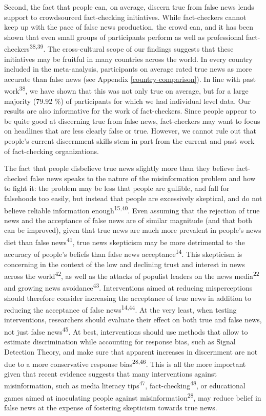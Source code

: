 \documentclass[
  doc,floatsintext]{apa6}
\begin{document}
Second, the fact that people can, on average, discern true from false news lends support to crowdsourced fact-checking initiatives. While fact-checkers cannot keep up with the pace of false news production, the crowd can, and it has been shown that even small groups of participants perform as well as professional fact-checkers\textsuperscript{38,39}. The cross-cultural scope of our findings suggests that these initiatives may be fruitful in many countries across the world. In every country included in the meta-analysis, participants on average rated true news as more accurate than false news (see Appendix \ref{country-comparison}). In line with past work\textsuperscript{38}, we have shown that this was not only true on average, but for a large majority (79.92 \%) of participants for which we had individual level data. Our results are also informative for the work of fact-checkers. Since people appear to be quite good at discerning true from false news, fact-checkers may want to focus on headlines that are less clearly false or true. However, we cannot rule out that people's current discernment skills stem in part from the current and past work of fact-checking organizations.

The fact that people disbelieve true news slightly more than they believe fact-checked false news speaks to the nature of the misinformation problem and how to fight it: the problem may be less that people are gullible, and fall for falsehoods too easily, but instead that people are excessively skeptical, and do not believe reliable information enough\textsuperscript{15,40}. Even assuming that the rejection of true news and the acceptance of false news are of similar magnitude (and that both can be improved), given that true news are much more prevalent in people's news diet than false news\textsuperscript{41}, true news skepticism may be more detrimental to the accuracy of people's beliefs than false news acceptance\textsuperscript{14}. This skepticism is concerning in the context of the low and declining trust and interest in news across the world\textsuperscript{42}, as well as the attacks of populist leaders on the news media\textsuperscript{22} and growing news avoidance\textsuperscript{43}. Interventions aimed at reducing misperceptions should therefore consider increasing the acceptance of true news in addition to reducing the acceptance of false news\textsuperscript{14,44}. At the very least, when testing interventions, researchers should evaluate their effect on both true and false news, not just false news\textsuperscript{45}. At best, interventions should use methods that allow to estimate discrimination while accounting for response bias, such as Signal Detection Theory, and make sure that apparent increases in discernment are not due to a more conservative response bias\textsuperscript{28,46}. This is all the more important given that recent evidence suggests that many interventions against misinformation, such as media literacy tips\textsuperscript{47}, fact-checking\textsuperscript{48}, or educational games aimed at inoculating people against misinformation\textsuperscript{28}, may reduce belief in false news at the expense of fostering skepticism towards true news.
\end{document}
